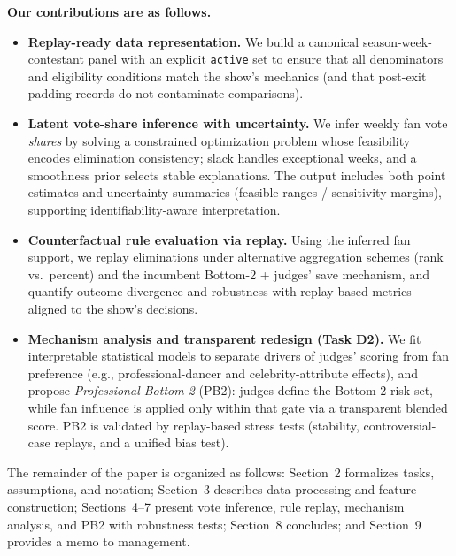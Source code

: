 \textbf{Our contributions are as follows.}
\begin{itemize}
  \item \textbf{Replay-ready data representation.}
  We build a canonical season-week-contestant panel with an explicit \texttt{active} set to ensure that all denominators and eligibility conditions match the show's mechanics (and that post-exit padding records do not contaminate comparisons).

  \item \textbf{Latent vote-share inference with uncertainty.}
  We infer weekly fan vote \emph{shares} by solving a constrained optimization problem whose feasibility encodes elimination consistency; slack handles exceptional weeks, and a smoothness prior selects stable explanations.
  The output includes both point estimates and uncertainty summaries (feasible ranges / sensitivity margins), supporting identifiability-aware interpretation.

  \item \textbf{Counterfactual rule evaluation via replay.}
  Using the inferred fan support, we replay eliminations under alternative aggregation schemes (rank vs.\ percent) and the incumbent Bottom-2 + judges' save mechanism, and quantify outcome divergence and robustness with replay-based metrics aligned to the show's decisions.

  \item \textbf{Mechanism analysis and transparent redesign (Task D2).}
  We fit interpretable statistical models to separate drivers of judges' scoring from fan preference (e.g., professional-dancer and celebrity-attribute effects), and propose \textit{Professional Bottom-2} (PB2): judges define the Bottom-2 risk set, while fan influence is applied only within that gate via a transparent blended score.
  PB2 is validated by replay-based stress tests (stability, controversial-case replays, and a unified bias test).
\end{itemize}

The remainder of the paper is organized as follows:
Section~2 formalizes tasks, assumptions, and notation;
Section~3 describes data processing and feature construction;
Sections~4--7 present vote inference, rule replay, mechanism analysis, and PB2 with robustness tests;
Section~8 concludes; and Section~9 provides a memo to management.
